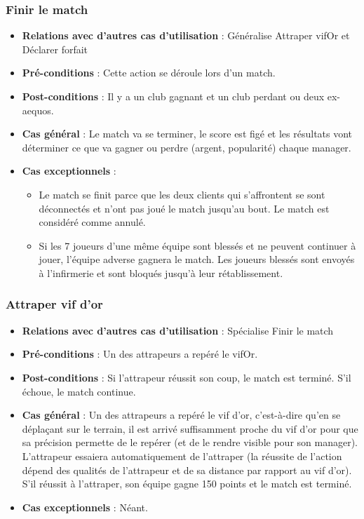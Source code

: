 \documentclass[a4paper,titlepage]{scrreprt}
\begin{document}
    \subsubsection{Finir le match}
      \begin{itemize}
        \item \textbf{Relations avec d'autres cas d'utilisation}  : Généralise Attraper \gls{vifOr} et Déclarer forfait
        \item \textbf{Pré-conditions} : Cette action se déroule lors d'un match.
        \item \textbf{Post-conditions} : Il y a un club gagnant et un club perdant ou deux ex-aequos.
        \item \textbf{Cas général} : Le match va se terminer, le score est figé et les résultats vont déterminer ce que va gagner ou perdre (argent, popularité) chaque manager.
        \item \textbf{Cas exceptionnels} :
          \begin{itemize}
            \item Le match se finit parce que les deux clients qui s’affrontent se sont déconnectés et n’ont pas joué le match jusqu’au bout. Le match est considéré comme annulé.
            \item Si les 7 joueurs d'une même équipe sont blessés et ne peuvent continuer à jouer, l'équipe adverse gagnera le match. Les joueurs blessés sont envoyés à l'infirmerie et sont bloqués jusqu'à leur rétablissement.
          \end{itemize}
      \end{itemize}
    \subsubsection{Attraper vif d'or}
      \begin{itemize}
        \item \textbf{Relations avec d'autres cas d'utilisation}  : Spécialise Finir le match
        \item \textbf{Pré-conditions} : Un des \gls{attrapeur}s  a repéré le \gls{vifOr}.
        \item \textbf{Post-conditions} : Si l'attrapeur réussit son coup, le match est terminé. S'il échoue, le match continue.
        \item \textbf{Cas général} : Un des attrapeurs a repéré le vif d’or, c’est-à-dire qu’en se déplaçant sur le terrain, il est arrivé suffisamment proche du vif d’or pour que sa précision permette de le repérer (et de le rendre visible pour son manager). L’attrapeur essaiera automatiquement de l’attraper (la réussite de l’action dépend des qualités de l’attrapeur et de sa distance par rapport au vif d’or). S’il réussit à l’attraper, son équipe gagne 150 points et le match est terminé.
        \item \textbf{Cas exceptionnels} : Néant.
      \end{itemize}
\end{document}
